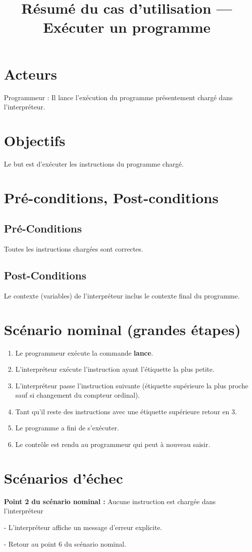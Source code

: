 \documentclass[12pt,a4paper]{article}
\title{Résumé du cas d'utilisation --- Exécuter un programme} %
\date{} %
\author{} %
\begin{document}
        \maketitle

        \section{Acteurs}
        Programmeur : Il lance l'exécution du programme présentement chargé dans l'interpréteur.

        \section{Objectifs}
        Le but est d'exécuter les instructions du programme chargé.

        \section{Pré-conditions, Post-conditions}

            \subsection{Pré-Conditions}
            Toutes les instructions chargées sont correctes.

            \subsection{Post-Conditions}
            Le contexte (variables) de l'interpréteur inclus le contexte final du programme.

        \section{Scénario nominal (grandes étapes)}
            \begin{enumerate}
            	\item Le programmeur exécute la commande \textbf{lance}.
            	\item L'interpréteur exécute l'instruction ayant l'étiquette la plus petite.
            	\item L'interpréteur passe l'instruction suivante (étiquette supérieure la plus proche sauf si changement du compteur ordinal).
            	\item Tant qu'il reste des instructions avec une étiquette supérieure retour en 3.
            	\item Le programme a fini de s'exécuter.
            	\item Le contrôle est rendu au programmeur qui peut à nouveau saisir.
            \end{enumerate}

        \section{Scénarios d'échec}
            \textbf{Point 2 du scénario nominal :} Aucune instruction est chargée dans l'interpréteur
            \par - L'interpréteur affiche un message d'erreur explicite.
            \par - Retour au point 6 du scénario nominal.

    
\end{document}
